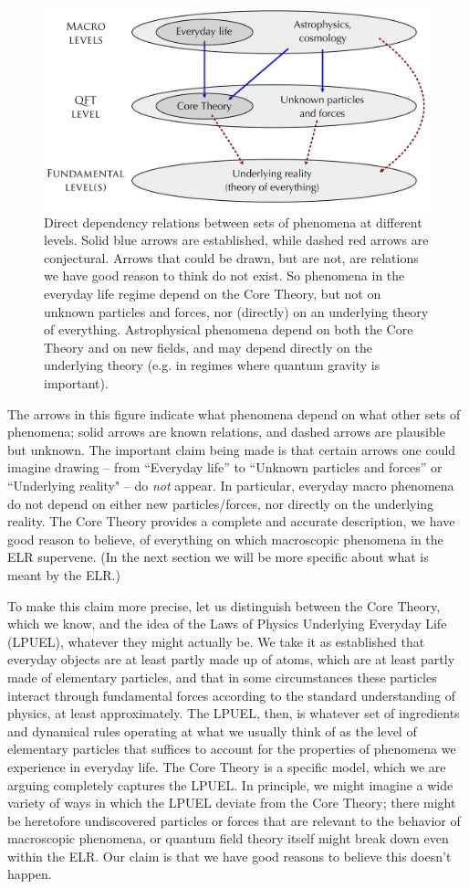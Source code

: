 \documentclass[12pt,letterpaper]{article}
\begin{document}
\begin{figure}[h]
\centering
\includegraphics[width=.75\textwidth]{supervenience5.pdf}
\caption{\small Direct dependency relations between sets of phenomena at different levels. Solid blue arrows are established, while dashed red arrows are conjectural. Arrows that could be drawn, but are not, are relations we have good reason to think do not exist. So phenomena in the everyday life regime depend on the Core Theory, but not on unknown particles and forces, nor (directly) on an underlying theory of everything. Astrophysical phenomena depend on both the Core Theory and on new fields, and may depend directly on the underlying theory (e.g. in regimes where quantum gravity is important).}
\label{fig:dependence}
\end{figure}

The arrows in this figure indicate what phenomena depend on what other sets of phenomena; solid arrows are known relations, and dashed arrows are plausible but unknown.
The important claim being made is that certain arrows one could imagine drawing -- from ``Everyday life'' to ``Unknown particles and forces'' or ``Underlying reality" -- do \emph{not} appear.
In particular, everyday macro phenomena do not depend on either new particles/forces, nor directly on the underlying reality.
The Core Theory provides a complete and accurate description, we have good reason to believe, of everything on which macroscopic phenomena in the ELR supervene.
(In the next section we will be more specific about what is meant by the ELR.)

To make this claim more precise, let us distinguish between the Core Theory, which we know, and the idea of the Laws of Physics Underlying Everyday Life (LPUEL), whatever they might actually be.
We take it as established that everyday objects are at least partly made up of atoms, which are at least partly made of elementary particles, and that in some circumstances these particles interact through fundamental forces according to the standard understanding of physics, at least approximately.
The LPUEL, then, is whatever set of ingredients and dynamical rules operating at what we usually think of as the level of elementary particles that suffices to account for the properties of phenomena we experience in everyday life.
The Core Theory is a specific model, which we are arguing completely captures the LPUEL.
In principle, we might imagine a wide variety of ways in which the LPUEL deviate from the Core Theory; there might be heretofore undiscovered particles or forces that are relevant to the behavior of macroscopic phenomena, or quantum field theory itself might break down even within the ELR.
Our claim is that we have good reasons to believe this doesn't happen.
\end{document}
